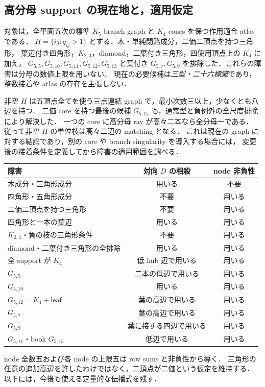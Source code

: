 \subsection{高分母 support の現在地と，適用仮定}
\label{ns19:current-support}

対象は，全平面五次の標準 $K_5$ branch graph と $K_4$ cones を保つ作用適合 atlas である．
$H=\{ij:q_{ij}>1\}$ とする．木・単純閉路成分，二価二頂点を持つ三角形，
葉辺付き四角形，$K_{2,3}$，diamond，二葉付き三角形，四使用頂点上の $K_4$ に加え，
$G_{5,5},G_{5,10},G_{5,11},G_{5,12},G_{5,13}$ と葉付き $G_{5,7},G_{5,9}$ を排除した．これらの障害は分母の数値上限を用いない．
現在の必要候補は\emph{三型・二十六標識}であり，整数接着や atlas の存在を主張しない．

非空 $H$ は五頂点全てを使う三点連結 graph で，最小次数三以上，少なくとも八辺を持つ．
二価 core を持つ最後の候補 $G_{5,15}$ も，通常型と負例外の全尺度排除により解決した．
一つの core に高分母 ray が高々二本なら全分母一である．
従って非空 $H$ の単位枝は高々二辺の matching となる．
これは現在の graph に対する結論であり，別の core や branch singularity を導入する場合には，
変更後の接着条件を定義してから障害の適用範囲を調べる．

\begin{center}
\begin{tabular}{lcc}
障害 & 対向 $D$ の相殺 & node 非負性\\\hline
木成分・三角形成分 & 用いる & 不要\\
四角形・五角形成分 & 不要 & 用いる\\
二価二頂点を持つ三角形 & 不要 & 用いる\\
四角形と一本の葉辺 & 用いる & 用いる\\
$K_{2,3}$・負の枝の三角形条件 & 不要 & 用いる\\
diamond・二葉付き三角形の全排除 & 用いる & 用いる\\
全 support が $K_4$ & 低 hub 辺で用いる & 用いる\\
$G_{5,5}$ & 二本の低辺で用いる & 用いる\\
$G_{5,10}$ & 用いる & 用いる\\
$G_{5,12}=K_4+\mathrm{leaf}$ & 葉の高辺で用いる & 用いる\\
$G_{5,7}$ & 葉の高辺で用いる & 用いる\\
$G_{5,9}$ & 葉に接する四辺で用いる & 用いる\\
$G_{5,11}$・book $G_{5,13}$ & 低辺で用いる & 用いる
\end{tabular}
\end{center}
node 全数五および各 node の上限五は row sums と非負性から導く．
三角形の任意の追加高辺を許したわけではなく，二頂点が二価という仮定を維持する．
以下には，今後も使える定量的な伝播式を残す．

